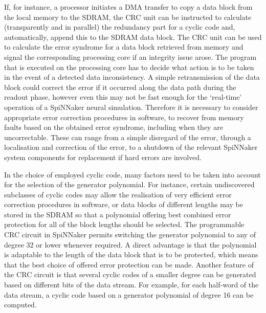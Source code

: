 \documentclass[oneside, a4paper, 11pt]{memoir}
\begin{document}
If, for instance, a processor initiates a DMA transfer to copy a data block from the local memory to the SDRAM, the CRC unit can be instructed to calculate (transparently and in parallel) the redundancy part for a cyclic code and, automatically, append this to the SDRAM data block. The CRC unit can be used to calculate the error syndrome for a data block retrieved from memory and signal the corresponding processing core if an integrity issue arose. The program that is executed on the processing core has to decide what action is to be taken in the event of a detected data inconsistency. A simple retransmission of the data block could correct the error if it occurred along the data path during the readout phase, however even this may not be fast enough for the `real-time' operation of a SpiNNaker neural simulation. Therefore it is necessary to consider appropriate error correction procedures in software, to recover from memory faults based on the obtained error syndrome, including when they are uncorrectable. These can range from a simple disregard of the error, through a localisation and correction of the error, to a shutdown of the relevant SpiNNaker system components for replacement if hard errors are involved.

In the choice of employed cyclic code, many factors need to be taken into account for the selection of the generator polynomial. For instance, certain undiscovered subclasses of cyclic codes may allow the realisation of very efficient error correction procedures in software, or data blocks of different lengths may be stored in the SDRAM so that a polynomial offering best combined error protection for all of the block lengths should be selected. The programmable CRC circuit in SpiNNaker permits switching the generator polynomial to any of degree 32 or lower whenever required. A direct advantage is that the polynomial is adaptable to the length of the data block that is to be protected, which means that the best choice of offered error protection can be made. Another feature of the CRC circuit is that several cyclic codes of a smaller degree can be generated based on different bits of the data stream. For example, for each half-word of the data stream, a cyclic code based on a generator polynomial of degree 16 can be computed.
\end{document}
